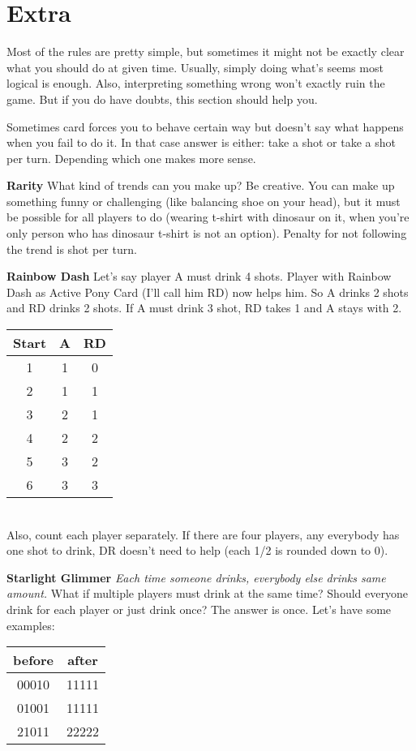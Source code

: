 \documentclass[notitlepage]{article}
\begin{document}
\section{Extra}
Most of the rules are pretty simple, but sometimes it might not be exactly clear what you should do at given time. Usually, simply doing what's seems most logical is enough. Also, interpreting something wrong won't exactly ruin the game. But if you do have doubts, this section should help you.

Sometimes card forces you to behave certain way but doesn't say what happens when you fail to do it. In that case answer is either: take a shot or take a shot per turn. Depending which one makes more sense.

\textbf{Rarity}\newline
What kind of trends can you make up? Be creative. You can make up something funny or challenging (like balancing shoe on your head), but it must be possible for all players to do (wearing t-shirt with dinosaur on it, when you're only person who has dinosaur t-shirt is not an option). Penalty for not following the trend is shot per turn.

\textbf{Rainbow Dash}\newline
Let's say player A must drink 4 shots. Player with Rainbow Dash as Active Pony Card (I'll call him RD) now helps him. So A drinks 2 shots and RD drinks 2 shots. If A must drink 3 shot, RD takes 1 and A stays with 2. \\
\begin{tabular}{| c | c | c |}
\hline
Start & A & RD \\ \hline
1 & 1 & 0 \\ \hline
2 & 1 & 1 \\ \hline
3 & 2 & 1 \\ \hline
4 & 2 & 2 \\ \hline
5 & 3 & 2 \\ \hline
6 & 3 & 3 \\ \hline
\end{tabular} \\
Also, count each player separately. If there are four players, any everybody has one shot to drink, DR doesn't need to help (each 1/2 is rounded down to 0).

\textbf{Starlight Glimmer}\newline
\textsl{Each time someone drinks, everybody else drinks same amount.} What if multiple players must drink at the same time? Should everyone drink for each player or just drink once? The answer is once. Let's have some examples: \\
\begin{tabular}{| c | c |}
\hline
before & after \\ \hline
00010 & 11111 \\ \hline
01001 & 11111 \\ \hline
21011 & 22222 \\ \hline
\end{tabular}
\end{document}
